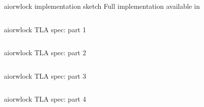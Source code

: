 \documentclass[12pt]{beamer}
\begin{document}
  \begin{frame}{aiorwlock implementation sketch}
      Full implementation available in~\cite{jettify2016}
      \begin{center}
          \inputminted[linenos,fontsize=\scriptsize]{python}{figures/read.py}
      \end{center}
  \end{frame}
  \begin{frame}{aiorwlock TLA spec: part 1}
      \begin{center}
          \inputminted[firstline=1,lastline=19,linenos,
            fontsize=\scriptsize]{tla}{figures/aiorwlock.tla}
      \end{center}
  \end{frame}
  \begin{frame}{aiorwlock TLA spec: part 2}
      \begin{center}
          \inputminted[firstline=20,lastline=31,linenos,
            fontsize=\scriptsize]{tla}{figures/aiorwlock.tla}
      \end{center}
  \end{frame}
  \begin{frame}{aiorwlock TLA spec: part 3}
      \begin{center}
          \inputminted[firstline=34,lastline=47,linenos,
            fontsize=\scriptsize]{tla}{figures/aiorwlock.tla}
      \end{center}
  \end{frame}
  \begin{frame}{aiorwlock TLA spec: part 4}
      \begin{center}
          \inputminted[firstline=47,lastline=58,linenos,
            fontsize=\scriptsize]{tla}{figures/aiorwlock.tla}
      \end{center}
  \end{frame}
\end{document}
